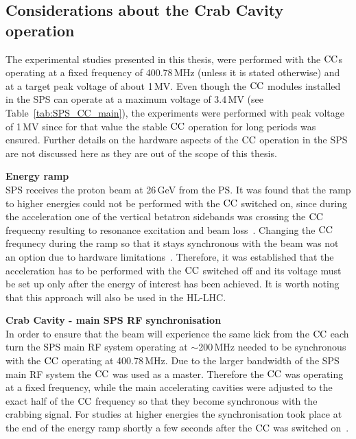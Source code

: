  
 \subsection{Considerations about the Crab Cavity operation}\label{sec:cc_setup}
The experimental studies presented in this thesis, were performed with the ${\mathrm{CC}}$s operating at a fixed frequency of 400.78\,MHz (unless it is stated otherwise) and at a target peak voltage of about 1\,MV. %
Even though the ${\mathrm{CC}}$ modules installed in the SPS can operate at a maximum voltage of 3.4\,MV (see Table~\ref{tab:SPS_CC_main}), the experiments were performed with peak voltage of 1\,MV since for that value the stable ${\mathrm{CC}}$ operation for long periods was ensured. Further details on the hardware aspects of the ${\mathrm{CC}}$ operation in the SPS are not discussed here as they are out of the scope of this thesis.

\normalsize{\textbf{Energy ramp}}\\
SPS receives the proton beam at 26\,GeV from the PS. It was found that the ramp to higher energies could not be performed with the ${\mathrm{CC}}$ switched on, since during the acceleration one of the vertical betatron sidebands was crossing the ${\mathrm{CC}}$ frequecny resulting to resonance excitation and beam loss~\cite{BE_seminar, CC_rephasing_RF}. Changing the ${\mathrm{CC}}$ frequnecy during the ramp so that it stays synchronous with the beam was not an option due to hardware limitations~\cite{CC_rephasing_RF}. %
Therefore, it was established that the acceleration has to be performed with the ${\mathrm{CC}}$ switched off and its voltage must be set up only after the energy of interest has been achieved. It is worth noting that this approach will also be used in the HL-LHC.

\normalsize{\textbf{Crab Cavity - main SPS RF synchronisation}}\\
In order to ensure that the beam will experience the same kick from the ${\mathrm{CC}}$ each turn the SPS main RF system operating at $\sim$200\,MHz needed to be synchronous with the ${\mathrm{CC}}$ operating at 400.78\,MHz. Due to the larger bandwidth of the SPS main RF system the ${\mathrm{CC}}$ was used as a master. Therefore the ${\mathrm{CC}}$ was operating at a fixed frequency, while the main accelerating cavities were adjusted to the exact half of the ${\mathrm{CC}}$ frequency so that they become synchronous with the crabbing signal. For studies at higher energies the synchronisation took place at the end of the energy ramp shortly a few seconds after the ${\mathrm{CC}}$ was switched on~\cite{BE_seminar}. %



